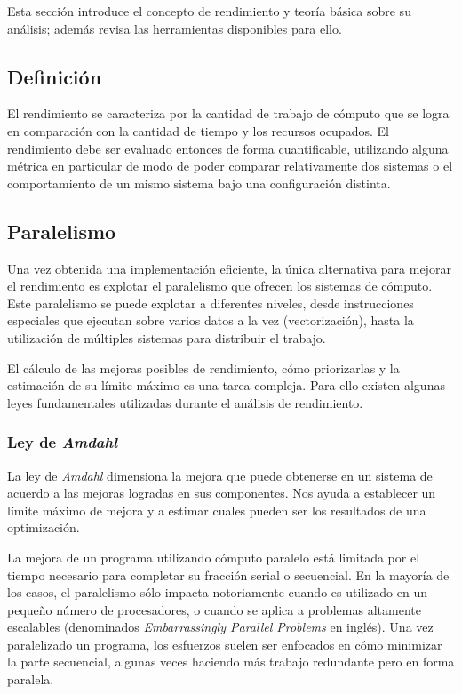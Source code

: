 \documentclass[a4paper]{report}
\begin{document}
Esta sección introduce el concepto de rendimiento y teoría básica sobre su análisis; además revisa las herramientas disponibles para ello.

\subsection{Definición}

El rendimiento se caracteriza por la cantidad de trabajo de cómputo que se logra en comparación con la cantidad de tiempo y los recursos ocupados.
El rendimiento debe ser evaluado entonces de forma cuantificable, utilizando alguna métrica en particular de modo de poder comparar relativamente dos sistemas o
el comportamiento de un mismo sistema bajo una configuración distinta.

\subsection{Paralelismo}

Una vez obtenida una implementación eficiente, la única alternativa para mejorar el rendimiento es explotar el paralelismo que ofrecen los sistemas de cómputo.
Este paralelismo se puede explotar a diferentes niveles, desde instrucciones especiales que ejecutan sobre varios datos a la vez (vectorización),
hasta la utilización de múltiples sistemas para distribuir el trabajo.

\bigskip

El cálculo de las mejoras posibles de rendimiento, cómo priorizarlas y la estimación de su límite máximo es una tarea compleja. 
Para ello existen algunas leyes fundamentales utilizadas durante el análisis de rendimiento.

\subsubsection{Ley de {\it Amdahl}}

 La ley de {\it Amdahl} \cite{amdahl} dimensiona la mejora que puede obtenerse en un sistema de acuerdo a las mejoras logradas en sus componentes. 
Nos ayuda a establecer un límite máximo de mejora y a estimar cuales pueden ser los resultados de una optimización.

\bigskip

La mejora de un programa utilizando cómputo paralelo está limitada por el tiempo necesario para completar su fracción serial o secuencial. En la mayoría de los casos, el paralelismo sólo impacta notoriamente cuando es utilizado en un pequeño número de procesadores, o cuando se aplica a problemas altamente escalables (denominados {\it Embarrassingly Parallel Problems} en inglés). Una vez paralelizado un programa, los esfuerzos suelen ser enfocados en cómo minimizar la parte secuencial, algunas veces haciendo más trabajo redundante pero en forma paralela.
\end{document}
